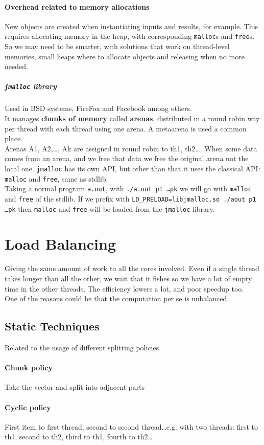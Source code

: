 \documentclass[10pt]{report}
\begin{document}
\paragraph{Overhead related to memory allocations} New objects are created when instantiating inputs and results, for example. This requires allocating memory in the heap, with corresponding \texttt{malloc}s and \texttt{free}s. So we may need to be smarter, with solutions that work on thread-level memories, small heaps where to allocate objects and releasing when no more needed.
\subparagraph{\texttt{jmalloc} library} Used in BSD systems, FireFox and Facebook among others.\\
It manages \textbf{chunks of memory} called \textbf{arenas}, distributed in a round robin way per thread with each thread using one arena. A metaarena is used a common place.\\
Arenas A1, A2,\ldots, Ak are assigned in round robin to th1, th2\ldots. When some data comes from an arena, and we free that data we free the original arena not the local one. \texttt{jmalloc} has its own API, but other than that it uses the classical API: \texttt{malloc} and \texttt{free}, same as stdlib.\\
Taking a normal program \texttt{a.out}, with \texttt{./a.out p1 \ldots pk} we will go with \texttt{malloc} and \texttt{free} of the stdlib. If we prefix with \texttt{LD\_PRELOAD=libjmalloc.so ./aout p1 \ldots pk} then \texttt{malloc} and \texttt{free} will be loaded from the \texttt{jmalloc} library.
\section{Load Balancing} Giving the same amount of work to all the cores involved. Even if a single thread takes longer than all the other, we wait that it fishes so we have a lot of empty time in the other threads. The efficiency lowers a lot, and poor speedup too.\\
One of the reasons could be that the computation per se is unbalanced.
\subsection{Static Techniques}
Related to the usage of different splitting policies.
\paragraph{Chunk policy} Take the vector and split into adjacent parts
\paragraph{Cyclic policy} First item to first thread, second to second thread\ldots e.g. with two threads: first to th1, second to th2, third to th1, fourth to th2\ldots
\end{document}
